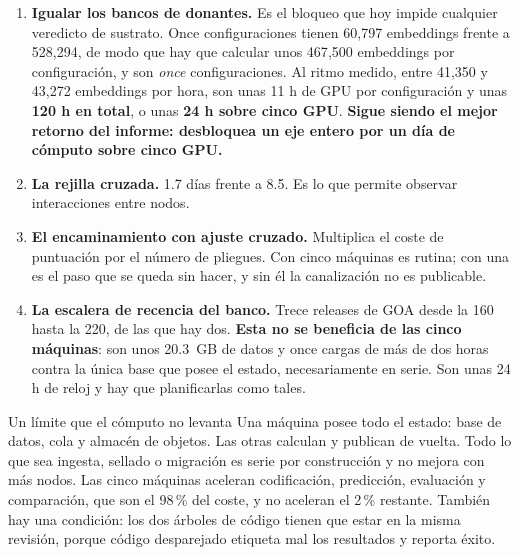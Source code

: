 \begin{enumerate}[leftmargin=1.5em,itemsep=0.4em]
  \item \textbf{Igualar los bancos de donantes.} Es el bloqueo que hoy impide
        cualquier veredicto de sustrato. Once configuraciones tienen 60{,}797
        embeddings frente a 528{,}294, de modo que hay que calcular unos 467{,}500
        embeddings por configuración, y son \emph{once} configuraciones. Al ritmo
        medido, entre 41{,}350 y 43{,}272 embeddings por hora, son unas 11 h de GPU
        por configuración y unas \textbf{120 h en total}, o unas \textbf{24 h sobre
        cinco GPU}. \textbf{Sigue siendo el mejor retorno del informe: desbloquea un
        eje entero por un día de cómputo sobre cinco GPU.}
  \item \textbf{La rejilla cruzada.} 1.7 días frente a 8.5. Es lo que permite
        observar interacciones entre nodos.
  \item \textbf{El encaminamiento con ajuste cruzado.} Multiplica el coste de
        puntuación por el número de pliegues. Con cinco máquinas es rutina; con una
        es el paso que se queda sin hacer, y sin él la canalización no es publicable.
  \item \textbf{La escalera de recencia del banco.} Trece releases de GOA desde la
        160 hasta la 220, de las que hay dos. \textbf{Esta no se beneficia de las
        cinco máquinas}: son unos 20.3~GB de datos y once cargas de más de dos horas
        contra la única base que posee el estado, necesariamente en serie. Son unas
        24 h de reloj y hay que planificarlas como tales.
\end{enumerate}

\begin{aviso}{Un límite que el cómputo no levanta}
Una máquina posee todo el estado: base de datos, cola y almacén de objetos. Las
otras calculan y publican de vuelta. Todo lo que sea ingesta, sellado o migración
es serie por construcción y no mejora con más nodos. Las cinco máquinas aceleran
codificación, predicción, evaluación y comparación, que son el 98\,\% del coste, y
no aceleran el 2\,\% restante. También hay una condición: los dos árboles de código
tienen que estar en la misma revisión, porque código desparejado etiqueta mal los
resultados y reporta éxito.
\end{aviso}
